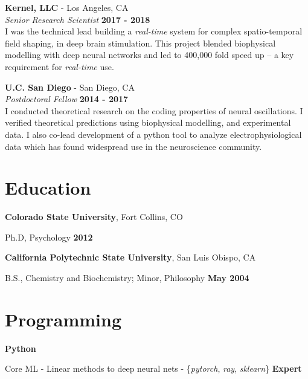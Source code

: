 \documentclass[margin,line]{res}
\newenvironment{list1}{
    \begin{list}{\ding{113}}{%
        \setlength{\itemsep}{0in}
        \setlength{\parsep}{0in} \setlength{\parskip}{0in}
        \setlength{\topsep}{0in} \setlength{\partopsep}{0in}
        \setlength{\leftmargin}{0.17in}}}{
    \end{list}}
\begin{document}
\begin{resume}
\vspace{-.2cm}
{\bf Kernel, LLC} - Los Angeles, CA\\
{\em Senior Research Scientist} \hfill {\bf 2017 - 2018}\\
I was the technical lead building a \emph{real-time} system for complex spatio-temporal field shaping, in deep brain stimulation. This project blended biophysical modelling with deep neural networks and led to 400,000 fold speed up -- a key requirement for \emph{real-time} use.

\vspace{-.2cm}
{\bf U.C. San Diego} - San Diego, CA\\
{\em Postdoctoral Fellow} \hfill {\bf 2014 - 2017}\\
I conducted theoretical research on the coding properties of neural oscillations. I verified theoretical predictions using biophysical modelling, and experimental data. I also co-lead development of a python tool to analyze electrophysiological data which has found widespread use in the neuroscience community.

\vspace{-.2cm}
\section{\sc Education}
{\bf Colorado State University}, Fort Collins, CO\\
\vspace*{-.15in}
\begin{list1}
    \tightlist
    \item[] Ph.D, Psychology \hfill {\bf 2012}
\end{list1}

\vspace*{-.15in}
{\bf California Polytechnic State University}, San Luis Obispo, CA\\
\vspace*{-.15in}
\begin{list1}
    \tightlist
    \item[] B.S., Chemistry and Biochemistry; Minor, Philosophy \hfill {\bf May 2004}
\end{list1}


\vspace{-.1cm}
\section{\sc Programming}
\vspace{-.1cm}
{\bf Python}\\
\vspace*{-.15in}
\begin{list1}
    \tightlist
    \item[] Core ML - Linear methods to deep neural nets - \{\emph{pytorch}, \emph{ray}, \emph{sklearn}\} \hfill {\bf Expert}
\end{list1}


\end{resume}
\end{document}
